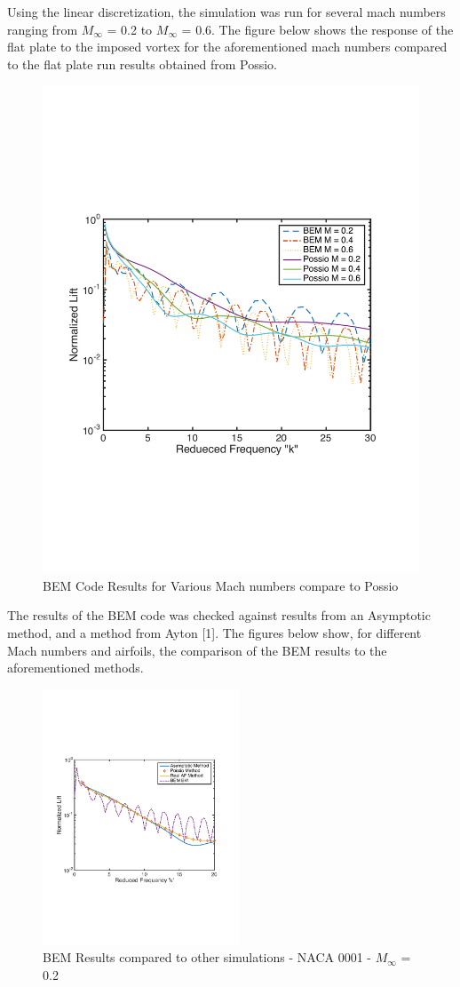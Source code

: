 \documentclass{article}
\begin{document}
\newpage
\noindent Using the linear discretization, the simulation was run for several mach numbers ranging from $M_{\infty}$ = 0.2 to  $M_{\infty}$ = 0.6. The figure below shows the response of the flat plate to the imposed vortex for the aforementioned mach numbers compared to the flat plate run results obtained from Possio.

\begin{figure}[h]
\includegraphics[width = 4 in, height = 3 in]{MachSweep_Compare}
\centering
\caption{BEM Code Results for Various Mach numbers compare to Possio}
\end{figure}

The results of the BEM code was checked against results from an Asymptotic method, and a method from Ayton [1]. The figures below show, for different Mach numbers and airfoils, the comparison of the BEM results to the aforementioned methods. 

\begin{figure}[h]
\includegraphics[width = 4 in, height = 3in]{NACA0001_m02}
\centering
\caption{BEM Results compared to other simulations - NACA 0001 - $M_\infty$ = 0.2}
\end{figure}
\end{document}

